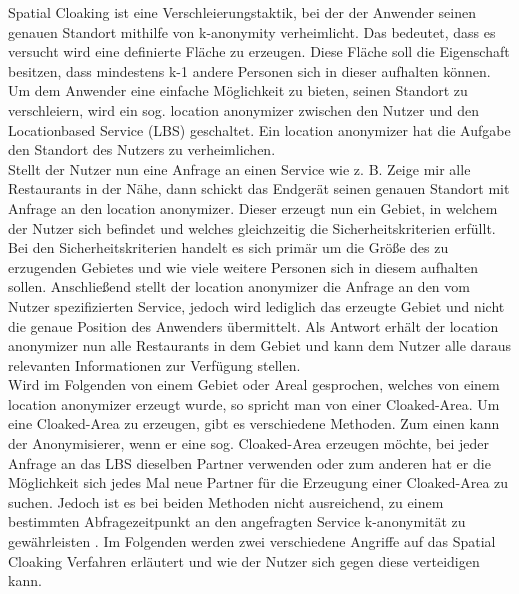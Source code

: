 Spatial Cloaking ist eine Verschleierungstaktik, bei der der Anwender seinen genauen Standort mithilfe von k-anonymity verheimlicht. Das bedeutet, dass es versucht wird eine definierte Fläche zu erzeugen. Diese Fläche soll die Eigenschaft besitzen, dass mindestens k-1 andere Personen sich in dieser aufhalten können. Um dem Anwender eine einfache Möglichkeit zu bieten, seinen Standort zu verschleiern, wird ein sog. location anonymizer zwischen den Nutzer und den Locationbased Service (LBS) geschaltet. Ein location anonymizer hat die Aufgabe den Standort des Nutzers zu verheimlichen. \\ 
Stellt der Nutzer nun eine Anfrage an einen Service wie z. B. \glqq Zeige mir alle Restaurants in der Nähe\grqq, dann schickt das Endgerät seinen genauen Standort mit Anfrage an den location anonymizer. Dieser erzeugt nun ein Gebiet, in welchem der Nutzer sich befindet und welches gleichzeitig die Sicherheitskriterien erfüllt. Bei den Sicherheitskriterien handelt es sich primär um die Größe des zu erzugenden Gebietes und wie viele weitere Personen sich in diesem aufhalten sollen. Anschließend stellt der location anonymizer die Anfrage an den vom Nutzer spezifizierten Service, jedoch wird lediglich das erzeugte Gebiet und nicht die genaue Position des Anwenders übermittelt. Als Antwort erhält der location anonymizer nun alle Restaurants in dem Gebiet und kann dem Nutzer alle daraus relevanten Informationen zur Verfügung stellen.\\ 
Wird im Folgenden von einem Gebiet oder Areal gesprochen, welches von einem location anonymizer erzeugt wurde, so spricht man von einer Cloaked-Area. Um eine Cloaked-Area zu erzeugen, gibt es verschiedene Methoden. Zum einen kann der Anonymisierer, wenn er eine sog. Cloaked-Area erzeugen möchte, bei jeder Anfrage an das LBS dieselben Partner verwenden oder zum anderen hat er die Möglichkeit sich jedes Mal neue Partner für die Erzeugung einer Cloaked-Area zu suchen. Jedoch ist es bei beiden Methoden nicht ausreichend, zu einem bestimmten Abfragezeitpunkt an den angefragten Service k-anonymität zu gewährleisten \cite{Chow2011}. Im Folgenden werden zwei verschiedene Angriffe auf das Spatial Cloaking Verfahren erläutert und wie der Nutzer sich gegen diese verteidigen kann. 
